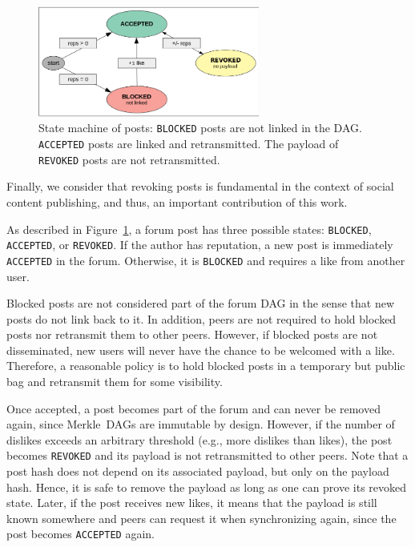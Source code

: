 \documentclass[12pt]{article}
\newcommand{\code}[1]  {\texttt{\footnotesize{#1}}}
\begin{document}
\begin{figure}
\centering
\includegraphics[width=0.65\textwidth]{state-revoked.png}
\caption{
    State machine of posts:
    \code{BLOCKED} posts are not linked in the DAG.
    \code{ACCEPTED} posts are linked and retransmitted.
    The payload of \code{REVOKED} posts are not retransmitted.
}
\label{fig.state}
\end{figure}

Finally, we consider that revoking posts is fundamental in the context of
social content publishing, and thus, an important contribution of this work.

As described in Figure~\ref{fig.state}, a forum post has three possible states:
\code{BLOCKED}, \code{ACCEPTED}, or \code{REVOKED}.
%
If the author has reputation, a new post is immediately \code{ACCEPTED} in the
forum.
%
Otherwise, it is \code{BLOCKED} and requires a like from another user.

Blocked posts are not considered part of the forum DAG in the sense that new
posts do not link back to it.
In addition, peers are not required to hold blocked posts nor retransmit them
to other peers.
However, if blocked posts are not disseminated, new users will never have the
chance to be welcomed with a like.
Therefore, a reasonable policy is to hold blocked posts in a temporary but
public bag and retransmit them for some visibility.

Once accepted, a post becomes part of the forum and can never be removed
again, since Merkle~DAGs are immutable by design.
%
However, if the number of dislikes exceeds an arbitrary threshold (e.g., more
dislikes than likes), the post becomes \code{REVOKED} and its payload is not
retransmitted to other peers.
Note that a post hash does not depend on its associated payload, but only on
the payload hash.
Hence, it is safe to remove the payload as long as one can prove its revoked
state.
Later, if the post receives new likes, it means that the payload is still known
somewhere and peers can request it when synchronizing again, since the post
becomes \code{ACCEPTED} again.
\end{document}
